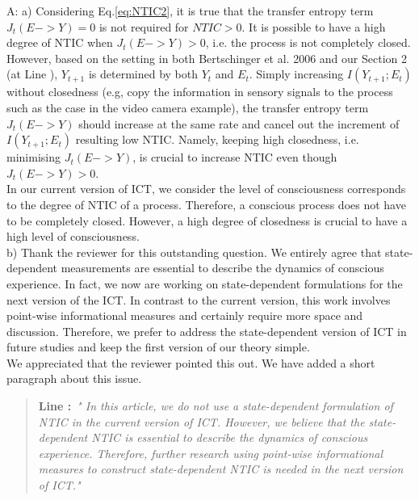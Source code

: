 \documentclass[utf8]{article}
\newenvironment{ans}  
    {\color{Black}\noindent A:}
    {~\newline}
\newcommand{\addnew}[2]{\blockcquote{}{\textbf{Line #1:}~\newline\textit{"#2"}}
}
\begin{document}
    	\begin{ans}
    		\newline
    		a) Considering Eq.\ref{eq:NTIC2}, it is true that the transfer entropy term $J_t(E -> Y)=0$ is not required for $NTIC>0$. It is possible to have a high degree of NTIC when $J_t(E -> Y) > 0$, i.e. the process is not completely closed.  \\
    		However, based on the setting in both Bertschinger et al. 2006 and our Section 2 (at Line ), $Y_{t+1}$ is determined by both $Y_t$ and $E_t$. Simply increasing $I(Y_{t+1}; E_t)$ without closedness (e.g, copy the information in sensory signals to the process such as the case in the video camera example), the transfer entropy term $J_t(E -> Y)$ should increase at the same rate and cancel out the increment of $I(Y_{t+1}; E_t)$ resulting low NTIC. Namely, keeping high closedness, i.e. minimising $J_t(E -> Y)$, is crucial to increase NTIC even though $J_t(E -> Y) > 0$.\\
    		In our current version of ICT, we consider the level of consciousness corresponds to the degree of NTIC of a process. Therefore, a conscious process does not have to be completely closed. However, a high degree of closedness is crucial to have a high level of consciousness.\\
    		
    		\noindent
    		b) Thank the reviewer for this outstanding question. We entirely agree that state-dependent measurements are essential to describe the dynamics of conscious experience. In fact, we now are working on state-dependent formulations for the next version of the ICT. In contrast to the current version, this work involves point-wise informational measures and certainly require more space and discussion. Therefore, we prefer to address the state-dependent version of ICT in future studies and keep the first version of our theory simple.\\
    		We appreciated that the reviewer pointed this out. We have added a short paragraph about this issue.
    	
	    	\addnew{}{
	    		In this article, we do not use a state-dependent formulation of NTIC in the current version of ICT. However, we believe that the state-dependent NTIC is essential to describe the dynamics of conscious experience. Therefore, further research using point-wise informational measures to construct state-dependent NTIC is needed in the next version of ICT.}
	    	
	    		
	    		
    	\end{ans}
        
\end{document}
